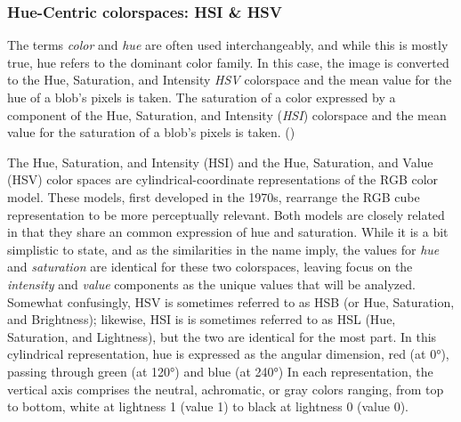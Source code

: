 \documentclass[letterpaper]{article}
\begin{document}
{\subsubsection{Hue-Centric colorspaces: HSI \& HSV}
The terms {\it color} and {\it hue} are often used interchangeably, and while this is mostly true, hue refers to the dominant color family. In this case, the image is converted to the Hue, Saturation, and Intensity {\it HSV} colorspace and the mean value for the hue of a blob's pixels is taken. The saturation of a color expressed by a component of the Hue, Saturation, and Intensity ({\it HSI}) colorspace and the mean value for the saturation of a blob's pixels is taken. (\cite{Forsyth2012-hy})

The Hue, Saturation, and Intensity (HSI) and the Hue, Saturation, and Value (HSV) color spaces are cylindrical-coordinate representations of the RGB color model.  These models, first developed in the 1970s, rearrange the RGB cube representation to be more perceptually relevant. Both models are closely related in that they share an common expression of hue and saturation. While it is a bit simplistic to state, and as the similarities in the name imply, the values for \textit{hue} and \textit{saturation} are identical for these two colorspaces, leaving focus on the \textit{intensity} and \textit{value} components as the unique values that will be analyzed. \parencite[p.~84]{Forsyth2012-hy} Somewhat confusingly, HSV is sometimes referred to as HSB (or Hue, Saturation, and Brightness); likewise, HSI is  is sometimes referred to as HSL (Hue, Saturation, and Lightness), but the two are identical for the most part. In this cylindrical representation, hue is expressed as the angular dimension, red (at 0\si{\degree}), passing through green (at 120\si{\degree}) and blue (at 240\si{\degree}) In each representation, the vertical axis comprises the neutral, achromatic, or gray colors ranging, from top to bottom, white at lightness 1 (value 1) to black at lightness 0 (value 0).

}
\end{document}
